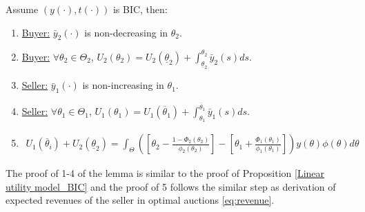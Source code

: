 \documentclass[11pt]{elegantbook_2}
\begin{document}
\begin{lemma}
    Assume $(y(\cdot),t(\cdot))$ is BIC, then:
    \begin{enumerate}
        \item \underline{Buyer:} $\bar{y}_2(\cdot)$ is non-decreasing in $\theta_2$.
        \item \underline{Buyer:} $\forall \theta_2\in\Theta_2$, $U_2(\theta_2)=U_2(\underline{\theta}_2)+\int_{\underline{\theta}_2}^{\theta_2}\bar{y}_2(s)ds$.
        \item \underline{Seller:} $\bar{y}_1(\cdot)$ is non-increasing in $\theta_1$.
        \item \underline{Seller:} $\forall \theta_1\in\Theta_1$, $U_1(\theta_1)=U_1(\overline{\theta}_1)+\int_{\theta_1}^{\overline{\theta}_1}\bar{y}_1(s)ds$.
        \item
        \begin{equation}
            \begin{aligned}
                U_1(\overline{\theta}_i)+U_2(\underline{\theta}_2)=\int_\Theta \left(\left[\theta_2-\frac{1-\Phi_2(\theta_2)}{\phi_2(\theta_2)}\right]-\left[\theta_1+\frac{\Phi_1(\theta_1)}{\phi_1(\theta_1)}\right]\right)y(\theta)\phi(\theta)d\theta
            \end{aligned}
            \nonumber
        \end{equation}
    \end{enumerate}
\end{lemma}
The proof of 1-4 of the lemma is similar to the proof of Proposition \ref{Linear utility model_BIC} and the proof of 5 follows the similar step as derivation of expected revenues of the seller in optimal auctions \eqref{eq:revenue}.
\end{document}
